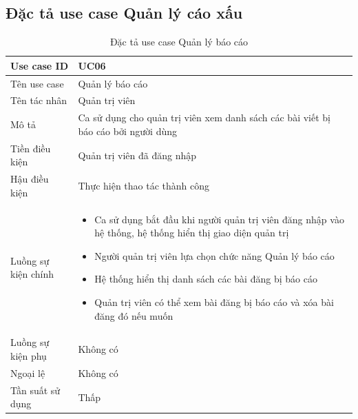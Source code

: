 \documentclass[../DoAn.tex]{subfiles}
\begin{document}
\subsection{Đặc tả use case Quản lý cáo xấu}
\hfill
\begin{table}[H]
\begin{tabular}{|p{3cm}|p{12cm}|}
\hline
Use case ID         & UC06                                                                                                               \\ \hline
Tên use case        & Quản lý báo cáo                                                                                                   \\ \hline
Tên tác nhân        & Quản trị viên                                                                                                         \\ \hline
Mô tả               & Ca sử dụng cho quản trị viên xem danh sách các bài viết bị báo cáo bởi người dùng\\ \hline
Tiền điều kiện      & Quản trị viên đã đăng nhập                                      \\ \hline
Hậu điều kiện       & Thực hiện thao tác thành công                                 \\ \hline
Luồng sự kiện chính & 
\begin{itemize}
    \item Ca sử dụng bắt đầu khi người quản trị viên đăng nhập vào hệ thống, hệ thống hiển thị giao diện quản trị
    \item Người quản trị viên lựa chọn chức năng Quản lý báo cáo
    \item Hệ thống hiển thị danh sách các bài đăng bị báo cáo
    \item Quản trị viên có thể xem bài đăng bị báo cáo và xóa bài đăng đó nếu muốn
\end{itemize} \\\hline
Luồng sự kiện phụ   & Không có\\ \hline
Ngoại lệ            & Không có                                                                                            \\ \hline
Tần suất sử dụng    & Thấp                                                                                                                \\ \hline
\end{tabular}
\caption{Đặc tả use case Quản lý báo cáo}
\label{tab:my-table}
\end{table}
\end{document}
